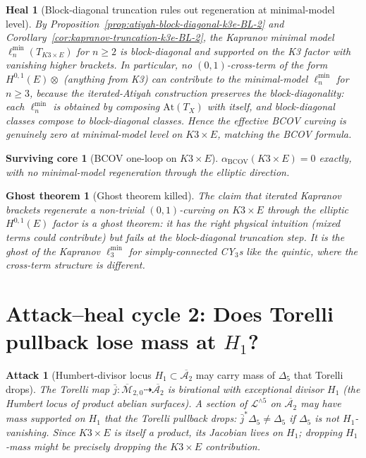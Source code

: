 \documentclass[11pt]{article}
\newtheorem{attack}[theorem]{Attack}
\newtheorem{heal}[theorem]{Heal}
\newtheorem{surviving}[theorem]{Surviving core}
\newtheorem{ghost}[theorem]{Ghost theorem}
\providecommand{\At}{\mathrm{At}}
\providecommand{\BCOV}{\mathrm{BCOV}}
\providecommand{\cA}{\mathcal{A}}
\providecommand{\cL}{\mathcal{L}}
\providecommand{\Mbar}{\overline{\mathcal M}}
\begin{document}
\begin{heal}[Block-diagonal truncation rules out regeneration at minimal-model level]
\label{heal:bcov-block-diagonal-BL-2}
By Proposition~\ref{prop:atiyah-block-diagonal-k3e-BL-2} and
Corollary~\ref{cor:kapranov-truncation-k3e-BL-2}, the Kapranov minimal
model $\ell_n^{\min}(T_{K3 \times E})$ for $n \geq 2$ is block-diagonal
and supported on the K3 factor with vanishing higher brackets.
In particular, no $(0, 1)$-cross-term of the form $H^{0, 1}(E) \otimes$
(anything from K3) can contribute to the minimal-model $\ell_n^{\min}$
for $n \geq 3$, because the iterated-Atiyah construction preserves
the block-diagonality: each $\ell_n^{\min}$ is obtained by composing
$\At(T_X)$ with itself, and block-diagonal classes compose to
block-diagonal classes. Hence the effective BCOV curving is genuinely
zero at minimal-model level on $K3 \times E$, matching the BCOV formula.
\end{heal}

\begin{surviving}[BCOV one-loop on $K3 \times E$]
\label{surv:bcov-k3e-BL-2}
$\alpha_\BCOV(K3 \times E) = 0$ exactly, with no minimal-model
regeneration through the elliptic direction.
\end{surviving}

\begin{ghost}[Ghost theorem killed]
\label{ghost:bcov-regenerate-BL-2}
The claim that iterated Kapranov brackets regenerate a non-trivial
$(0, 1)$-curving on $K3 \times E$ through the elliptic $H^{0, 1}(E)$
factor is a \emph{ghost theorem}: it has the right physical intuition
(mixed terms could contribute) but fails at the block-diagonal
truncation step. It is the ghost of the Kapranov $\ell_3^{\min}$ for
simply-connected CY$_3$s like the quintic, where the cross-term
structure is different.
\end{ghost}

\section{Attack--heal cycle 2: Does Torelli pullback lose mass at $H_1$?}
\label{sec:attack-cycle-2}

\begin{attack}[Humbert-divisor locus $H_1 \subset \overline{\cA_2}$ may carry mass of $\Delta_5$ that Torelli drops]
\label{att:humbert-mass-BL-2}
The Torelli map $\bar j \colon \Mbar_{2, 0} \dashrightarrow \overline{\cA_2}$
is birational with exceptional divisor $H_1$ (the Humbert locus of
product abelian surfaces). A section of $\cL^{\wedge 5}$ on
$\overline{\cA_2}$ may have mass supported on $H_1$ that the Torelli
pullback drops: $\bar j^* \Delta_5 \neq \Delta_5$ if $\Delta_5$ is
not $H_1$-vanishing. Since $K3 \times E$ is itself a product, its
Jacobian lives on $H_1$; dropping $H_1$-mass might be precisely
dropping the $K3 \times E$ contribution.
\end{attack}
\end{document}
